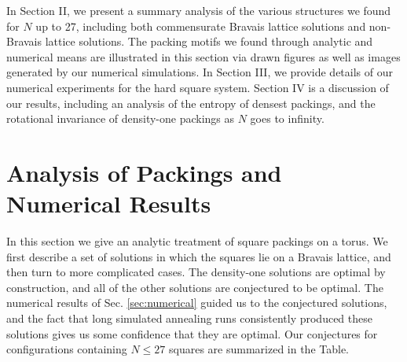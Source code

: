 \documentclass[aps]{revtex4}
\begin{document}
In Section II, we present a summary analysis of the various structures we found for $N$ up to 27, including both commensurate Bravais lattice solutions and non-Bravais lattice solutions.  The packing motifs we found through analytic and numerical means are illustrated in this section via drawn figures as well as images generated by our numerical simulations. In Section III, we provide details of our numerical experiments for the hard square system. Section IV is a discussion of our results, including an analysis of the entropy of densest packings, and the rotational invariance of density-one packings as $N$ goes to infinity. 

\section{Analysis of Packings and Numerical Results}
\label{sec:analytics}

In this section we give an analytic treatment of square packings on a torus.  We first describe a set of solutions in which the squares lie on a Bravais lattice, and then turn to more complicated cases. The density-one solutions are optimal by construction, and all of the other solutions are conjectured to be optimal. The numerical results of Sec. \ref{sec:numerical} guided us to the conjectured solutions, and the fact that long simulated annealing runs consistently produced these solutions gives us some confidence that they are optimal.  Our conjectures for configurations containing $N \leq 27$ squares are summarized in the Table.
\end{document}
